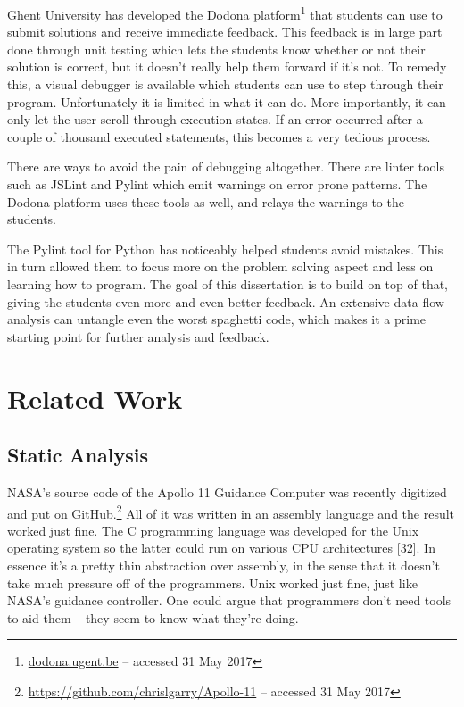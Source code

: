 \documentclass[a4paper, 16pt, oneside]{Thesis}
\begin{document}
Ghent University has developed the Dodona platform\footnote{\url{dodona.ugent.be}
  -- accessed 31 May 2017} that students can use to submit solutions and
receive immediate feedback. This feedback is in large part done through
unit testing which lets the students know whether or not their solution
is correct, but it doesn't really help them forward if it's not. To
remedy this, a visual debugger is available which students can use to
step through their program. Unfortunately it is limited in what it can
do. More importantly, it can only let the user scroll through execution
states. If an error occurred after a couple of thousand executed
statements, this becomes a very tedious process.

There are ways to avoid the pain of debugging altogether. There are
linter tools such as JSLint and Pylint which emit warnings on error
prone patterns. The Dodona platform uses these tools as well, and relays
the warnings to the students.

The Pylint tool for Python has noticeably helped students avoid
mistakes. This in turn allowed them to focus more on the problem solving
aspect and less on learning how to program. The goal of this
dissertation is to build on top of that, giving the students even more
and even better feedback. An extensive data-flow analysis can untangle
even the worst spaghetti code, which makes it a prime starting point for
further analysis and feedback.

\chapter{Related Work}\label{related-work}

\section{Static Analysis}\label{static-analysis}

NASA's source code of the Apollo 11 Guidance Computer was recently
digitized and put on GitHub.\footnote{\url{https://github.com/chrislgarry/Apollo-11}
  -- accessed 31 May 2017} All of it was written in an assembly language
and the result worked just fine. The C programming language was
developed for the Unix operating system so the latter could run on
various CPU architectures {[}32{]}. In essence it's a pretty thin
abstraction over assembly, in the sense that it doesn't take much
pressure off of the programmers. Unix worked just fine, just like NASA's
guidance controller. One could argue that programmers don't need tools
to aid them -- they seem to know what they're doing.
\end{document}

